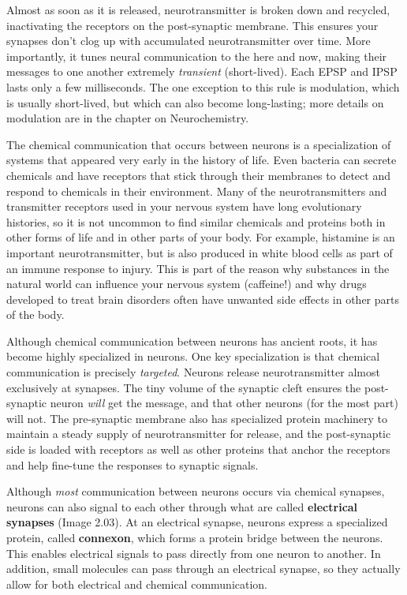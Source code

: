 \documentclass[
]{book}
\begin{document}
Almost as soon as it is released, neurotransmitter is broken down and recycled, inactivating the receptors on the post-synaptic membrane. This ensures your synapses don't clog up with accumulated neurotransmitter over time. More importantly, it tunes neural communication to the here and now, making their messages to one another extremely \emph{transient} (short-lived). Each EPSP and IPSP lasts only a few milliseconds. The one exception to this rule is modulation, which is usually short-lived, but which can also become long-lasting; more details on modulation are in the chapter on Neurochemistry.

The chemical communication that occurs between neurons is a specialization of systems that appeared very early in the history of life. Even bacteria can secrete chemicals and have receptors that stick through their membranes to detect and respond to chemicals in their environment. Many of the neurotransmitters and transmitter receptors used in your nervous system have long evolutionary histories, so it is not uncommon to find similar chemicals and proteins both in other forms of life and in other parts of your body. For example, histamine is an important neurotransmitter, but is also produced in white blood cells as part of an immune response to injury. This is part of the reason why substances in the natural world can influence your nervous system (caffeine!) and why drugs developed to treat brain disorders often have unwanted side effects in other parts of the body.

Although chemical communication between neurons has ancient roots, it has become highly specialized in neurons. One key specialization is that chemical communication is precisely \emph{targeted}. Neurons release neurotransmitter almost exclusively at synapses. The tiny volume of the synaptic cleft ensures the post-synaptic neuron \emph{will} get the message, and that other neurons (for the most part) will not. The pre-synaptic membrane also has specialized protein machinery to maintain a steady supply of neurotransmitter for release, and the post-synaptic side is loaded with receptors as well as other proteins that anchor the receptors and help fine-tune the responses to synaptic signals.

Although \emph{most} communication between neurons occurs via chemical synapses, neurons can also signal to each other through what are called \textbf{electrical synapses }(Image 2.03). At an electrical synapse, neurons express a specialized protein, called \textbf{connexon}, which forms a protein bridge between the neurons. This enables electrical signals to pass directly from one neuron to another. In addition, small molecules can pass through an electrical synapse, so they actually allow for both electrical and chemical communication.
\end{document}
